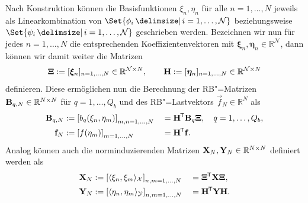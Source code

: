 \documentclass[../main.tex]{subfiles}
\begin{document}
Nach Konstruktion können die Basisfunktionen $\xi_{n}, \eta_{n}$ für alle $n = 1, \dots, N$ jeweils als Linearkombination von $\Set{ \phi_{i} \given i = 1, \dots, \mathcal N}$ beziehungsweise $\Set{ \psi_{i} \given i = 1, \dots, \mathcal N}$ geschrieben werden.
Bezeichnen wir nun für jedes $n = 1, \dots, N$ die entsprechenden Koeffizientenvektoren mit $\bm \xi_{n}, \bm \eta_{n} \in \mathbb{R}^{\mathcal N}$, dann können wir damit weiter die Matrizen
\begin{equation}
  \mathbf{\Xi} := [\bm \xi_{n}]_{n = 1, \dots, N} \in \mathbb{R}^{\mathcal N \times N},
  \qquad
  \mathbf{H}   := [\bm \eta_{n}]_{n = 1, \dots, N} \in \mathbb{R}^{\mathcal N \times N}
\end{equation}
definieren.
Diese ermöglichen nun die Berechnung der RB"=Matrizen $\mathbf{B}_{q,N} \in \mathbb{R}^{N \times N}$ für $q = 1, \dots, Q_{b}$ und des RB"=Lastvektors $\vec{f}_{N} \in \mathbb{R}^{N}$ als
\begin{equation}\label{eq:rb_systemmatrix_und_lastvektor}
    \begin{aligned}
        \mathbf{B}_{q,N} &:= \left[ b_{q}(\xi_{n}, \eta_{m}) \right]_{m, n = 1, \dots, N}
            &&= \mathbf{H}^{\mkern-1.5mu\mathsf{T}} \mathbf{B}_{q} \mathbf{\Xi}, \quad q = 1, \dots, Q_{b},
        \\
        \mathbf{f}_{N} &:= \left[ f(\eta_{m}) \right]_{m = 1, \dots, N}
            &&= \mathbf{H}^{\mkern-1.5mu\mathsf{T}} \mathbf{f}.
    \end{aligned}
\end{equation}
Analog können auch die norminduzierenden Matrizen $\mathbf{X}_{N}, \mathbf{Y}_{N} \in \mathbb{R}^{N \times N}$ definiert werden als
\begin{equation}\label{eq:rb_normmatrizen}
    \begin{aligned}
    \mathbf{X}_{N} &:= \left[ \langle\xi_{n},\xi_{m}\rangle_{\mathcal X} \right]_{n,m = 1, \dots, N}
        &&= \mathbf{\Xi}^{\mkern-1.5mu\mathsf{T}} \mathbf{X} \mathbf{\Xi},
    \\
    \mathbf{Y}_{N} &:= \left[ \langle\eta_{n},\eta_{m}\rangle_{\mathcal Y} \right]_{n,m = 1, \dots, N}
        &&= \mathbf{H}^{\mkern-1.5mu\mathsf{T}} \mathbf{Y} \mathbf{H}.
    \end{aligned}
\end{equation}
\end{document}

